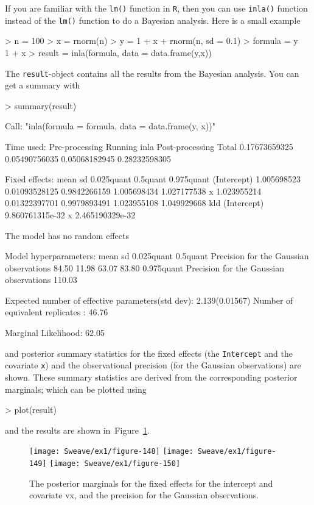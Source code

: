 \documentclass[a4paper,11pt]{report}
\newcommand{\tv}{\texttt}
\def\Fig#1{Figure~\ref{#1}}
\begin{document}
If you are familiar with the \verb|lm()| function in \tv{R}, then you
can use \verb|inla()| function instead of the \verb|lm()| function to
do a Bayesian analysis. Here is a small example
\begin{Schunk}
\begin{Sinput}
> n = 100
> x = rnorm(n)
> y = 1 + x + rnorm(n, sd = 0.1)
> formula = y ~ 1 + x
> result = inla(formula, data = data.frame(y,x))
\end{Sinput}
\end{Schunk}
The \verb|result|-object contains all the results from the Bayesian analysis.
You can get a summary with
\begin{Schunk}
\begin{Sinput}
> summary(result)
\end{Sinput}
\begin{Soutput}
Call:
"inla(formula = formula, data = data.frame(y, x))"

Time used:
 Pre-processing    Running inla Post-processing           Total 
  0.17673659325   0.05490756035   0.05068182945   0.28232598305 

Fixed effects:
                   mean            sd   0.025quant    0.5quant  0.975quant
(Intercept) 1.005698523 0.01093528125 0.9842266159 1.005698434 1.027177538
x           1.023955214 0.01322397701 0.9979893491 1.023955108 1.049929668
                        kld
(Intercept) 9.860761315e-32
x           2.465190329e-32

The model has no random effects

Model hyperparameters:
                                        mean   sd     0.025quant 0.5quant
Precision for the Gaussian observations  84.50  11.98  63.07      83.80  
                                        0.975quant
Precision for the Gaussian observations 110.03    

Expected number of effective parameters(std dev): 2.139(0.01567)
Number of equivalent replicates : 46.76 

Marginal Likelihood:  62.05 
\end{Soutput}
\end{Schunk}
and posterior summary statistics for the fixed effects (the
\tv{Intercept} and the covariate \tv{x}) and the observational
precision (for the Gaussian observations) are shown. These summary
statistics are derived from the corresponding posterior marginals;
which can be plotted using
\begin{Schunk}
\begin{Sinput}
> plot(result)
\end{Sinput}
\end{Schunk}
and the results are shown in~\Fig{fig:11}.
\begin{figure}[tbp]\centering\texttt{[image: Sweave/ex1/figure-148]}
\texttt{[image: Sweave/ex1/figure-149]}
\texttt{[image: Sweave/ex1/figure-150]}\caption{The posterior marginals for the fixed effects for the intercept and covariate 	v{x}, and the precision for the Gaussian observations.}\label{fig:11}\end{figure}
\end{document}
